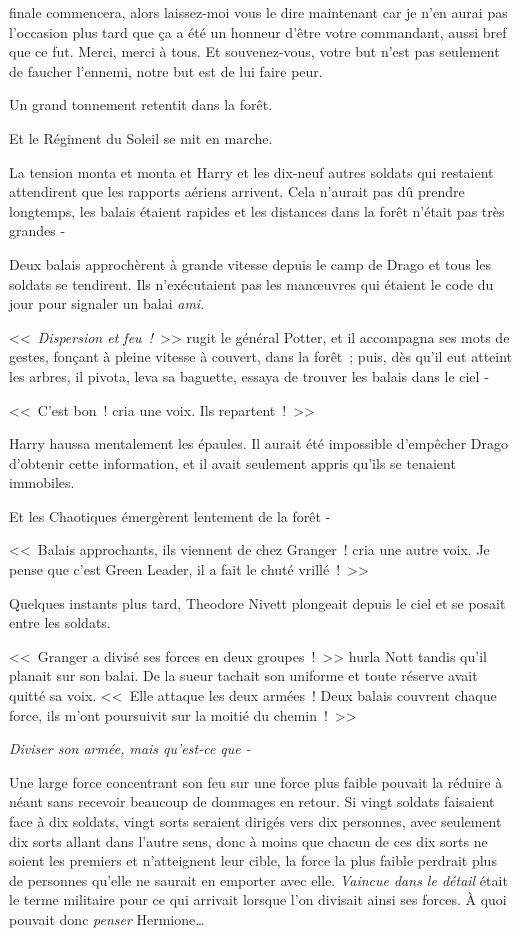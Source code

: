 finale commencera, alors laissez-moi vous le dire maintenant car je n'en aurai pas l'occasion plus tard que ça a été un honneur d'être votre commandant, aussi bref que ce fut. Merci, merci à tous. Et souvenez-vous, votre but n'est pas seulement de faucher l'ennemi, notre but est de lui faire peur.

\later

Un grand tonnement retentit dans la forêt.

Et le Régiment du Soleil se mit en marche.

\later

La tension monta et monta et Harry et les dix-neuf autres soldats qui restaient attendirent que les rapports aériens arrivent. Cela n'aurait pas dû prendre longtemps, les balais étaient rapides et les distances dans la forêt n'était pas très grandes -

Deux balais approchèrent à grande vitesse depuis le camp de Drago et tous les soldats se tendirent. Ils n'exécutaient pas les manœuvres qui étaient le code du jour pour signaler un balai \emph{ami}.

<<~\emph{Dispersion et feu~!}~>> rugit le général Potter, et il accompagna ses mots de gestes, fonçant à pleine vitesse à couvert, dans la forêt~; puis, dès qu'il eut atteint les arbres, il pivota, leva sa baguette, essaya de trouver les balais dans le ciel -

<<~C'est bon~! cria une voix. Ils repartent~!~>>

Harry haussa mentalement les épaules. Il aurait été impossible d'empêcher Drago d'obtenir cette information, et il avait seulement appris qu'ils se tenaient immobiles.

Et les Chaotiques émergèrent lentement de la forêt -

<<~Balais approchants, ils viennent de chez Granger~! cria une autre voix. Je pense que c'est Green Leader, il a fait le chuté vrillé~!~>>

Quelques instants plus tard, Theodore Nivett plongeait depuis le ciel et se posait entre les soldats.

<<~Granger a divisé ses forces en deux groupes~!~>> hurla Nott tandis qu'il planait sur son balai. De la sueur tachait son uniforme et toute réserve avait quitté sa voix. <<~Elle attaque les deux armées~! Deux balais couvrent chaque force, ils m'ont poursuivit sur la moitié du chemin~!~>>

\emph{Diviser son armée, mais qu'est-ce que -}

Une large force concentrant son feu sur une force plus faible pouvait la réduire à néant sans recevoir beaucoup de dommages en retour. Si vingt soldats faisaient face à dix soldats, vingt sorts seraient dirigés vers dix personnes, avec seulement dix sorts allant dans l'autre sens, donc à moins que chacun de ces dix sorts ne soient les premiers et n'atteignent leur cible, la force la plus faible perdrait plus de personnes qu'elle ne saurait en emporter avec elle. \emph{Vaincue dans le détail} était le terme militaire pour ce qui arrivait lorsque l'on divisait ainsi ses forces. À quoi pouvait donc \emph{penser} Hermione…

